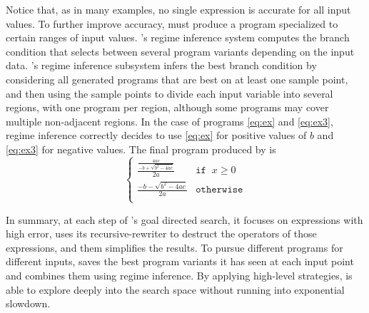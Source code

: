 \documentclass[paper.tex]{subfiles}
\begin{document}
Notice that, as in many examples, no single expression is accurate for
all input values.  To further improve accuracy, \casio must produce a
program specialized to certain ranges of input values.  \casio's
regime inference system computes the branch condition that selects
between several program variants depending on the input data.
\casio's regime inference subsystem infers the best branch condition
by considering all generated programs that are best on at least one
sample point, and then using the sample points to divide each input
variable into several regions, with one program per region, although
some programs may cover multiple non-adjacent regions.  In the case of
programs \eqref{eq:ex} and \eqref{eq:ex3}, regime inference correctly
decides to use \eqref{eq:ex} for positive values of $b$ and
\eqref{eq:ex3} for negative values.  The final program produced by
\casio is
\[
\begin{cases}
  \frac{\frac{4ac}
             {-b + \sqrt{b^2 - 4ac}}}
       {2a} & \mathtt{if} \;\; x \ge 0 \\[8pt]
  \frac{-b - \sqrt{b^2 - 4ac}}
       {2a} & \mathtt{otherwise} \\
\end{cases}
\]

In summary, at each step of \casio's goal directed search, it focuses
on expressions with high error, uses its recursive-rewriter to
destruct the operators of those expressions, and them simplifies the
results.  To pursue different programs for different inputs, \casio
saves the best program variants it has seen at each input point and
combines them using regime inference.  By applying high-level
strategies, \casio is able to explore deeply into the search space
without running into exponential slowdown.
\end{document}
